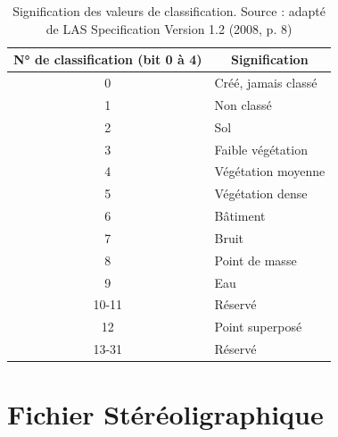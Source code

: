 \begin{table}[htbp!]
\centering
\begin{tabular}{|c|l|}
\hline
\textbf{N° de classification (bit 0 à 4)} & \multicolumn{1}{c|}{\textbf{Signification}} \\ \hline
0                                         & Créé, jamais classé                         \\ \hline
1                                         & Non classé                                  \\ \hline
2                                         & Sol                                         \\ \hline
3                                         & Faible végétation                           \\ \hline
4                                         & Végétation moyenne                          \\ \hline
5                                         & Végétation dense                            \\ \hline
6                                         & Bâtiment                                    \\ \hline
7                                         & Bruit                                       \\ \hline
8                                         & Point de masse                              \\ \hline
9                                         & Eau                                         \\ \hline
10-11                                     & Réservé                                     \\ \hline
12                                        & Point superposé                             \\ \hline
13-31                                     & Réservé                                     \\ \hline
\end{tabular}
\caption{Signification des valeurs de classification. Source : adapté de LAS Specification Version 1.2 (2008, p. 8)}
\label{tab:las_point_class_meaning}
\end{table}

\section{Fichier Stéréoligraphique}

